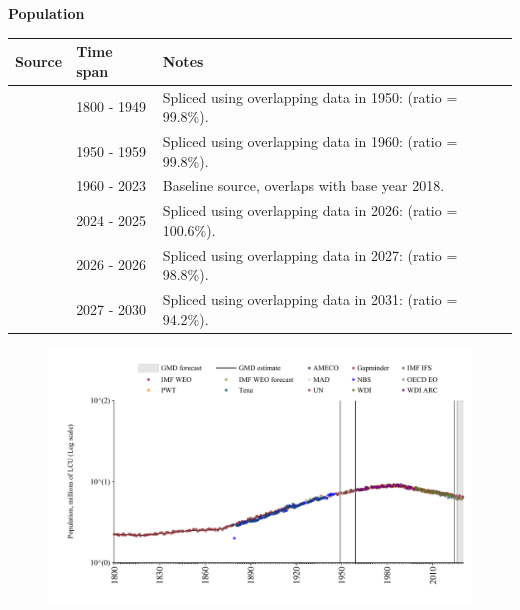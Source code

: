 \documentclass[12pt,a4paper,landscape]{article}
\begin{document}
\begin{adjustbox}{max totalsize={\paperwidth}{\paperheight},center}
\begin{minipage}[t][\textheight][t]{\textwidth}
\vspace*{0.5cm}
{}
\begin{center}
{\Large\bfseries Population}
\end{center}
\vspace{0.5cm}
\begin{table}[H]
\centering
\small
\begin{tabular}{|l|l|l|}
\hline
\textbf{Source} & \textbf{Time span} & \textbf{Notes} \\
\hline
\rowcolor{white}\cite{Gapminder}& 1800 - 1949 &Spliced using overlapping data in 1950: (ratio = 99.8\%). \\
\rowcolor{lightgray}\cite{IMF_IFS}& 1950 - 1959 &Spliced using overlapping data in 1960: (ratio = 99.8\%). \\
\rowcolor{white}\cite{WDI}& 1960 - 2023 &Baseline source, overlaps with base year 2018. \\
\rowcolor{lightgray}\cite{OECD_EO}& 2024 - 2025 &Spliced using overlapping data in 2026: (ratio = 100.6\%). \\
\rowcolor{white}\cite{AMECO}& 2026 - 2026 &Spliced using overlapping data in 2027: (ratio = 98.8\%). \\
\rowcolor{lightgray}\cite{Gapminder}& 2027 - 2030 &Spliced using overlapping data in 2031: (ratio = 94.2\%). \\
\hline
\end{tabular}
\end{table}
\begin{figure}[H]
\centering
\includegraphics[width=\textwidth,height=0.6\textheight,keepaspectratio]{graphs/BGR_pop.pdf}
\end{figure}
\end{minipage}
\end{adjustbox}
\end{document}

